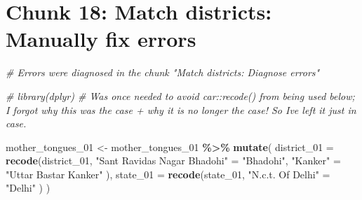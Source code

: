 \documentclass[
]{article}
\newenvironment{Shaded}{\begin{snugshade}}{\end{snugshade}}
\newcommand{\AttributeTok}[1]{\textcolor[rgb]{0.13,0.29,0.53}{#1}}
\newcommand{\CommentTok}[1]{\textcolor[rgb]{0.56,0.35,0.01}{\textit{#1}}}
\newcommand{\FunctionTok}[1]{\textcolor[rgb]{0.13,0.29,0.53}{\textbf{#1}}}
\newcommand{\NormalTok}[1]{#1}
\newcommand{\OtherTok}[1]{\textcolor[rgb]{0.56,0.35,0.01}{#1}}
\newcommand{\SpecialCharTok}[1]{\textcolor[rgb]{0.81,0.36,0.00}{\textbf{#1}}}
\newcommand{\StringTok}[1]{\textcolor[rgb]{0.31,0.60,0.02}{#1}}
\begin{document}
\section*{Chunk 18: Match districts: Manually fix errors}\label{chunk-18-match-districts-manually-fix-errors}

\begin{Shaded}
\begin{Highlighting}[]
\CommentTok{\# Errors were diagnosed in the chunk "Match districts: Diagnose errors"}

\CommentTok{\# library(dplyr) \# Was once needed to avoid car::recode() from being used below; I forgot why this was the case + why it is no longer the case! So I\textquotesingle{}ve left it just in case.}


\NormalTok{mother\_tongues\_01 }\OtherTok{\textless{}{-}}\NormalTok{ mother\_tongues\_01 }\SpecialCharTok{\%\textgreater{}\%}
  \FunctionTok{mutate}\NormalTok{(}
    \AttributeTok{district\_01 =} \FunctionTok{recode}\NormalTok{(district\_01,}
      \StringTok{"Sant Ravidas Nagar Bhadohi"} \OtherTok{=} \StringTok{"Bhadohi"}\NormalTok{,}
      \StringTok{"Kanker"} \OtherTok{=} \StringTok{"Uttar Bastar Kanker"}
\NormalTok{      ),}
    \AttributeTok{state\_01 =} \FunctionTok{recode}\NormalTok{(state\_01,}
      \StringTok{"N.c.t. Of Delhi"} \OtherTok{=} \StringTok{"Delhi"}
\NormalTok{      )}
\NormalTok{    )}



\end{Highlighting}
\end{Shaded}
\end{document}
